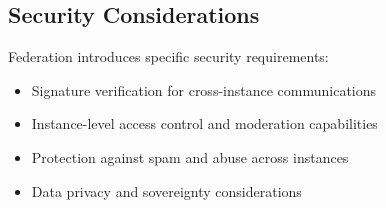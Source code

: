 \subsection{Security Considerations}
Federation introduces specific security requirements:
\begin{itemize}
    \item Signature verification for cross-instance communications
    \item Instance-level access control and moderation capabilities
    \item Protection against spam and abuse across instances
    \item Data privacy and sovereignty considerations
\end{itemize}
